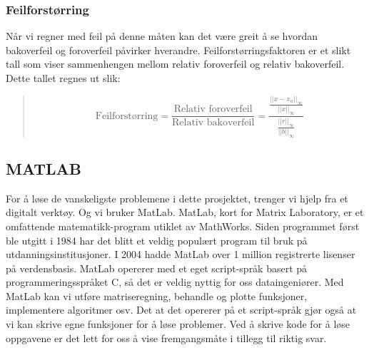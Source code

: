 \subsubsection{Feilforstørring}
Når vi regner med feil på denne måten kan det være greit å se hvordan bakoverfeil og foroverfeil påvirker hverandre. Feilforstørringsfaktoren er et slikt tall som viser sammenhengen mellom relativ foroverfeil og relativ bakoverfeil. Dette tallet regnes ut slik:
\begin{quote}
\begin{equation*}
\mbox{Feilforstørring} = \frac{\mbox{Relativ foroverfeil}}{\mbox{Relativ bakoverfeil}} = \frac{\frac{||x - x_a||_{\infty}}{||x||_{\infty}}}{\frac{||r||_{\infty}}{||b||_{\infty}}}
\end{equation*}
\end{quote}
 
\subsection{MATLAB}
For å løse de vanskeligste problemene i dette prosjektet, trenger vi hjelp fra et digitalt verktøy. Og vi bruker MatLab. MatLab, kort for Matrix Laboratory, er et omfattende matematikk-program utiklet av MathWorks. Siden programmet først ble utgitt i 1984 har det blitt et veldig populært program til bruk på utdanningsinstitusjoner. I 2004 hadde MatLab over 1 million registrerte lisenser på verdensbasis.
MatLab opererer med et eget script-språk basert på programmeringsspråket C, så det er veldig nyttig for oss dataingeniører. Med MatLab kan vi utføre matriseregning, behandle og plotte funksjoner, implementere algoritmer osv. Det at det opererer på et script-språk gjør også at vi kan skrive egne funksjoner for å løse problemer. Ved å skrive kode for å løse oppgavene er det lett for oss å vise fremgangsmåte i tillegg til riktig svar.

